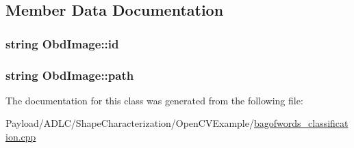 \subsection{Member Data Documentation}
\hypertarget{classObdImage_ac2389a2b08a8607e2f553f17906d9eaa}{
\subsubsection[{id}]{\setlength{\rightskip}{0pt plus 5cm}string Obd\-Image\-::id}}\label{classObdImage_ac2389a2b08a8607e2f553f17906d9eaa}
\hypertarget{classObdImage_a377e0798ce5595b84d1bd8f111628fca}{
\subsubsection[{path}]{\setlength{\rightskip}{0pt plus 5cm}string Obd\-Image\-::path}}\label{classObdImage_a377e0798ce5595b84d1bd8f111628fca}


The documentation for this class was generated from the following file\-:\begin{DoxyCompactItemize}
\item 
Payload/\-A\-D\-L\-C/\-Shape\-Characterization/\-Open\-C\-V\-Example/\hyperlink{bagofwords__classification_8cpp}{bagofwords\-\_\-classification.\-cpp}\end{DoxyCompactItemize}
